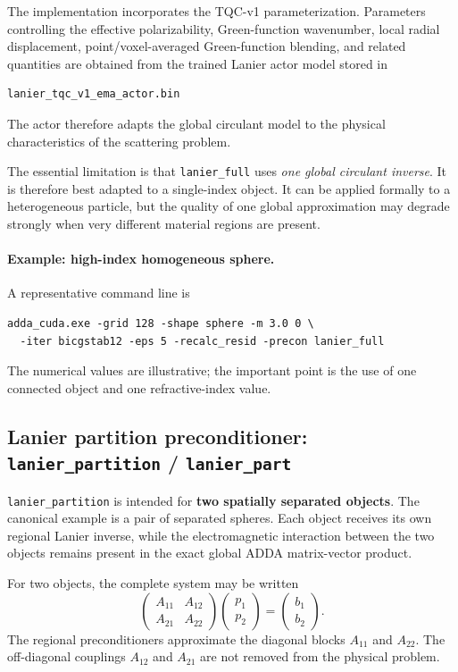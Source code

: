 \documentclass[11pt,a4paper]{article}
\begin{document}
The implementation incorporates the TQC-v1 parameterization. Parameters controlling the effective polarizability, Green-function wavenumber, local radial displacement, point/voxel-averaged Green-function blending, and related quantities are obtained from the trained Lanier actor model stored in
\begin{verbatim}
lanier_tqc_v1_ema_actor.bin
\end{verbatim}
The actor therefore adapts the global circulant model to the physical characteristics of the scattering problem.

The essential limitation is that \texttt{lanier\_full} uses \emph{one global circulant inverse}. It is therefore best adapted to a single-index object. It can be applied formally to a heterogeneous particle, but the quality of one global approximation may degrade strongly when very different material regions are present.

\paragraph{Example: high-index homogeneous sphere.}
A representative command line is
\begin{verbatim}
adda_cuda.exe -grid 128 -shape sphere -m 3.0 0 \
  -iter bicgstab12 -eps 5 -recalc_resid -precon lanier_full
\end{verbatim}
The numerical values are illustrative; the important point is the use of one connected object and one refractive-index value.

\subsection{Lanier partition preconditioner: \texttt{lanier\_partition} / \texttt{lanier\_part}}

\texttt{lanier\_partition} is intended for \textbf{two spatially separated objects}. The canonical example is a pair of separated spheres. Each object receives its own regional Lanier inverse, while the electromagnetic interaction between the two objects remains present in the exact global ADDA matrix-vector product.

For two objects, the complete system may be written
\begin{equation}
\begin{pmatrix}
A_{11} & A_{12}\\
A_{21} & A_{22}
\end{pmatrix}
\begin{pmatrix}
p_1\\
p_2
\end{pmatrix}
=
\begin{pmatrix}
b_1\\
b_2
\end{pmatrix}.
\end{equation}
The regional preconditioners approximate the diagonal blocks \(A_{11}\) and \(A_{22}\). The off-diagonal couplings \(A_{12}\) and \(A_{21}\) are not removed from the physical problem.
\end{document}
